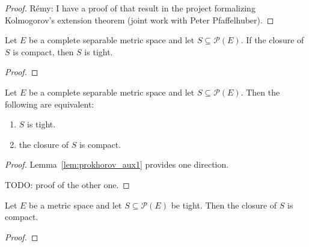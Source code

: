 \begin{proof}
Rémy: I have a proof of that result in the project formalizing Kolmogorov's extension theorem (joint work with Peter Pfaffelhuber).
\end{proof}

\begin{lemma}\label{lem:prokhorov_aux1}
Let $E$ be a complete separable metric space and let $S \subseteq \mathcal P(E)$. If the closure of $S$ is compact, then $S$ is tight.
\end{lemma}

\begin{proof}
\end{proof}

\begin{theorem}\label{thm:prokhorov}
Let $E$ be a complete separable metric space and let $S \subseteq \mathcal P(E)$. Then the following are equivalent:
\begin{enumerate}
	\item $S$ is tight.
	\item the closure of $S$ is compact.
\end{enumerate}
\end{theorem}

\begin{proof}
Lemma~\ref{lem:prokhorov_aux1} provides one direction.

TODO: proof of the other one.
\end{proof}

\begin{lemma}\label{lem:relatively_compact_of_tight}
Let $E$ be a metric space and let $S \subseteq \mathcal P(E)$ be tight. Then the closure of $S$ is compact.
\end{lemma}

\begin{proof}
\end{proof}
